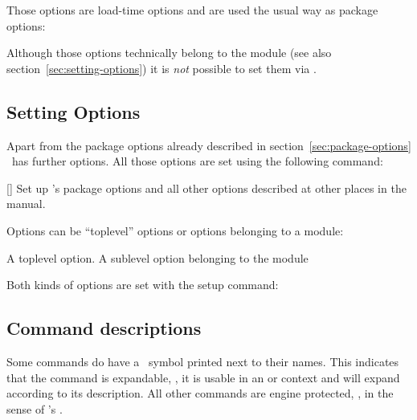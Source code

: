\documentclass{xsim-manual}
\begin{document}
Those options are load-time options and are used the usual way as package
options:
\begin{sourcecode}
  \usepackage[use-files]{xsim}
\end{sourcecode}
\begin{bewareofthedog}
  Although those options technically belong to the  module
  (see also section~\vref{sec:setting-options}) it is \emph{not} possible to
  set them via .
\end{bewareofthedog}

\subsection{Setting Options}\label{sec:setting-options}
Apart from the package options already described in
section~\vref{sec:package-options} \xsim\ has further options.  All those
options are set using the following command:
\begin{commands}
  []
    Set up \xsim's package options and all other options described at
    other places in the manual.
\end{commands}
Options can be \enquote{toplevel} options or options belonging to a module:
\begin{options}
    A toplevel option.
    A sublevel option belonging to the module 
\end{options}
Both kinds of options are set with the setup command:
\begin{sourcecode}
\end{sourcecode}

\subsection{Command descriptions}

Some commands do have a \expandablesymbol\ symbol printed next to their
names.  This indicates that the command is expandable, \ie, it is usable in an
 or  context and will expand according to its
description.  All other commands are engine protected, \ie, in the sense of
\eTeX's .
\end{document}
